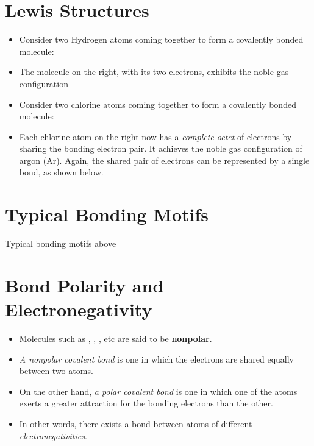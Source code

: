 \documentclass[
	chapter=9,
	title={Basic Concepts of Chemical Bonding},
	showanswers=true,
]{chem122notes}
\begin{document}
\section{Lewis Structures}\label{sec:lewis-structures}
\begin{itemize}
	\item Consider two Hydrogen atoms coming together to form a covalently bonded  molecule:
	\item The  molecule on the right, with its two electrons, exhibits the noble-gas configuration
	\item Consider two chlorine atoms coming together to form a covalently bonded  molecule:
	\item Each chlorine atom on the right now has a \textit{complete octet} of electrons by sharing the bonding electron pair.
	It achieves the noble gas configuration of argon (Ar).
	Again, the shared pair of electrons can be represented by a single bond, as shown below.
\end{itemize}

\section{Typical Bonding Motifs}\label{sec:typical-bonding-motifs}
Typical bonding motifs above

\section{Bond Polarity and Electronegativity}\label{sec:bond-polarity-and-electronegativity}
\begin{itemize}
	\item Molecules such as , , , etc are said to be \textbf{nonpolar}.
	\item \emph{A nonpolar covalent bond} is one in which the electrons are shared equally between two atoms.
	\item On the other hand, \emph{a polar covalent bond} is one in which one of the atoms exerts a greater attraction for the bonding electrons than the other.
	\item In other words, there exists a bond between atoms of different \emph{electronegativities}.
\end{itemize}
\end{document}
